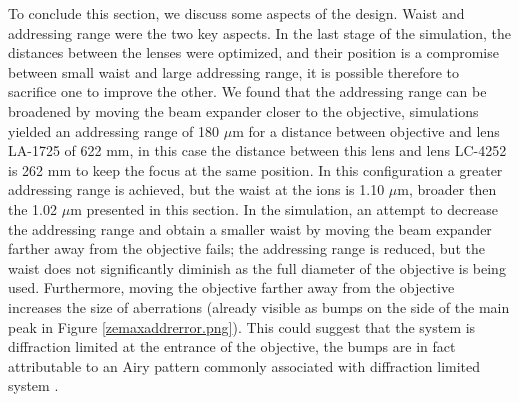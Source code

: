 To conclude this section, we discuss some aspects of the design. Waist and addressing range were the two key aspects. In the last stage of the simulation, the distances between the lenses were optimized, and their position is a compromise between small waist and large addressing range, it is possible therefore to sacrifice one to improve the other. We found that the addressing range can be broadened by moving the beam expander closer to the objective, simulations yielded an addressing range of 180 $\mu$m for a distance between objective and lens LA-1725 of 622 mm, in this case the distance between this lens and lens LC-4252 is 262 mm to keep the focus at the same position. In this configuration a greater addressing range is achieved, but the waist at the ions is 1.10 $\mu$m, broader then the 1.02 $\mu$m presented in this section. In the simulation, an attempt to decrease the addressing range and obtain a smaller waist by moving the beam expander farther away from the objective fails; the addressing range is reduced, but the waist does not significantly diminish as the full diameter of the objective is being used. Furthermore, moving the objective farther away from the objective increases the size of aberrations (already visible as bumps on the side of the main peak in Figure \ref{zemaxaddrerror.png}). This could suggest that the system is diffraction limited at the entrance of the objective, the bumps are in fact attributable to an Airy pattern commonly associated with diffraction limited system \cite{dlimited}.
